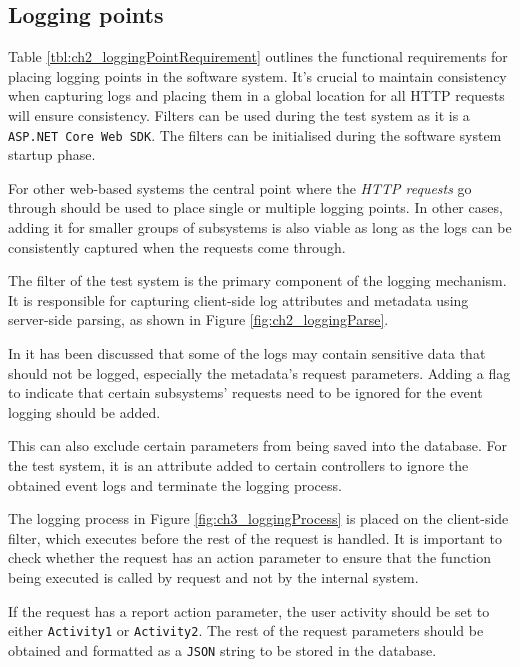 \clearpage

\subsection{Logging points}
Table \ref{tbl:ch2_loggingPointRequirement} outlines the functional requirements for placing logging points in the software system. It's crucial to maintain consistency when capturing logs and placing them in a global location for all HTTP requests will ensure consistency. Filters can be used during the test system as it is a \texttt{ASP.NET Core Web SDK}. The filters can be initialised during the software system startup phase.\par For other web-based systems the central point where the \textit{HTTP requests} go through should be used to place single or multiple logging points. In other cases, adding it for smaller groups of subsystems is also viable as long as the logs can be consistently captured when the requests come through. \par The filter of the test system is the primary component of the logging mechanism. It is responsible for capturing client-side log attributes and metadata using server-side parsing, as shown in Figure \ref{fig:ch2_loggingParse}. \par In  it has been discussed that some of the logs may contain sensitive data that should not be logged, especially the metadata's request parameters. Adding a flag to indicate that certain subsystems' requests need to be ignored for the event logging should be added.\par This can also exclude certain parameters from being saved into the database. For the test system, it is an attribute added to certain controllers to ignore the obtained event logs and terminate the logging process.\par The logging process in Figure \ref{fig:ch3_loggingProcess} is placed on the client-side filter, which executes before the rest of the request is handled. It is important to check whether the request has an action parameter to ensure that the function being executed is called by request and not by the internal system.\par If the request has a report action parameter, the user activity should be set to either \texttt{Activity1} or \texttt{Activity2}. The rest of the request parameters should be obtained and formatted as a \texttt{JSON} string to be stored in the database.

